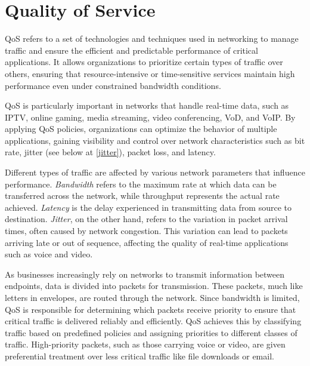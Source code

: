 \section{Quality of Service}

\ac{QoS} refers to a set of technologies and techniques used in networking to manage traffic and ensure the efficient and predictable performance of critical applications. It allows organizations to prioritize certain types of traffic over others, ensuring that resource-intensive or time-sensitive services maintain high performance even under constrained bandwidth conditions.

QoS is particularly important in networks that handle real-time data, such as \ac{IPTV}, online gaming, media streaming, video conferencing, \ac{VoD}, and \ac{VoIP}. By applying QoS policies, organizations can optimize the behavior of multiple applications, gaining visibility and control over network characteristics such as bit rate, jitter (see below at \ref{jitter}), packet loss, and latency.\cite{rhim_what_2024}\cite{hpe_juniper_networking_what_nodate}\cite{paloalto_networks_what_nodate}\cite{fortinet_what_nodate}


Different types of traffic are affected by various network parameters that influence performance. \textit{Bandwidth} refers to the maximum rate at which data can be transferred across the network, while throughput represents the actual rate achieved. \textit{Latency} is the delay experienced in transmitting data from source to destination. \textit{Jitter}, on the other hand, refers to the variation in packet arrival times, often caused by network congestion. This variation can lead to packets arriving late or out of sequence, affecting the quality of real-time applications such as voice and video.\label{jitter}\cite{paloalto_networks_what_nodate}\cite{fortinet_what_nodate}


As businesses increasingly rely on networks to transmit information between endpoints, data is divided into packets for transmission. These packets, much like letters in envelopes, are routed through the network. Since bandwidth is limited, QoS is responsible for determining which packets receive priority to ensure that critical traffic is delivered reliably and efficiently. QoS achieves this by classifying traffic based on predefined policies and assigning priorities to different classes of traffic. High-priority packets, such as those carrying voice or video, are given preferential treatment over less critical traffic like file downloads or email.

